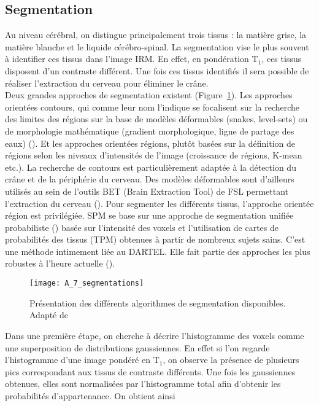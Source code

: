 \subsection{Segmentation}
Au niveau cérébral, on distingue principalement trois tissus : la matière grise, la matière
blanche et le liquide cérébro-spinal. La segmentation vise le plus souvent à identifier ces tissus dans
l’image IRM. En effet, en pondération T$_1$, ces tissus disposent d’un contraste différent. Une fois ces
tissus identifiés il sera possible de réaliser l’extraction du cerveau pour éliminer le crâne.\\
Deux grandes approches de segmentation existent (Figure~\ref{fig:A_7_segmentations}). Les approches orientées
contours, qui comme leur nom l’indique se focalisent sur la recherche des limites des régions sur la
base de modèles déformables (snakes, level-sets) ou de morphologie mathématique (gradient morphologique, ligne de partage des eaux) (\cite{Scherrer2008}). Et les approches orientées régions, plutôt basées
sur la définition de régions selon les niveaux d’intensités de l’image (croissance de régions, K-mean
etc.). La recherche de contours est particulièrement adaptée à la détection du crâne et de la périphérie
du cerveau. Des modèles déformables sont d’ailleurs utilisés au sein de l’outils BET (Brain Extraction
Tool) de FSL permettant l’extraction du cerveau (\cite{Smith2002}). Pour segmenter les différents tissus, l’approche
orientée région est privilégiée. SPM se base sur une approche de segmentation unifiée probabiliste
(\cite{Ashburner2005}) basée sur l’intensité des voxels et l’utilisation de cartes de probabilités des tissus (TPM) obtenues
à partir de nombreux sujets sains. C’est une méthode intimement liée au DARTEL. Elle fait partie des
approches les plus robustes à l’heure actuelle (\cite{Malone2015}). 
\begin{figure}[!t]
\centering
\texttt{[image: A\_7\_segmentations]}
\caption{Présentation des différents algorithmes de segmentation disponibles. Adapté de \cite{Scherrer2008}}
\label{fig:A_7_segmentations}	
\end{figure}
Dans une première étape, on cherche à décrire
l’histogramme des voxels comme une superposition de distributions gaussiennes. En effet si l’on
regarde l’histogramme d’une image pondéré en T$_1$, on observe la présence de plusieurs pics
correspondant aux tissus de contraste différents. Une fois les gaussiennes obtenues, elles sont
normalisées par l’histogramme total afin d’obtenir les probabilités d’appartenance. On obtient ainsi
